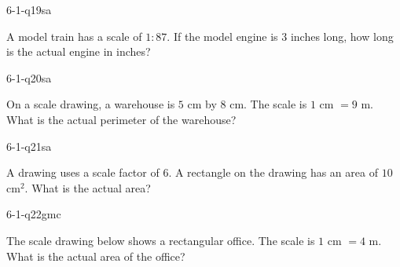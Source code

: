 \begin{practiceQuestion}{6-1-q19}{sa}
\begin{questionText}
A model train has a scale of $1:87$. If the model engine is $3$ inches long, how long is the actual engine in inches?
\end{questionText}
\end{practiceQuestion}

\begin{practiceQuestion}{6-1-q20}{sa}
\begin{questionText}
On a scale drawing, a warehouse is $5$ cm by $8$ cm. The scale is $1$ cm $= 9$ m. What is the actual perimeter of the warehouse?
\end{questionText}
\end{practiceQuestion}

\begin{practiceQuestion}{6-1-q21}{sa}
\begin{questionText}
A drawing uses a scale factor of $6$. A rectangle on the drawing has an area of $10$ cm$^2$. What is the actual area?
\end{questionText}
\end{practiceQuestion}


\begin{practiceQuestion}{6-1-q22}{gmc}
\begin{questionText}
The scale drawing below shows a rectangular office. The scale is $1$ cm $= 4$ m. What is the actual area of the office?

\begin{center}
\end{center}
\end{questionText}
\end{practiceQuestion}

